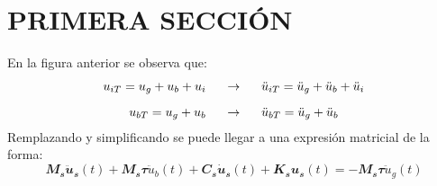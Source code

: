 \section{PRIMERA SECCIÓN}

En la figura anterior se observa que:
\begin{subequations}\label{Cap3_Eq1}
\begin{gather}
u_{iT}=u_{g}+u_{b}+u_{i} \hspace{5mm} \rightarrow \hspace{5mm} \ddot{u}_{iT}=\ddot{u}_{g}+\ddot{u}_{b}+\ddot{u}_{i}		\label{Cap3_Eq1_1} \\[2 mm]
u_{bT}=u_{g}+u_{b}\hspace{5mm} \rightarrow \hspace{5mm} \ddot{u}_{bT}=\ddot{u}_{g}+\ddot{u}_{b} \label{Cap3_Eq1_2}
\end{gather}
\end{subequations}
Remplazando y simplificando se puede llegar a una expresión matricial de la forma: 
\begin{equation}\label{Cap3_Eq3}
\mathbfit{M_{s}\ddot{u}_{s}}(t)+\mathbfit{M_{s}\tau}\ddot{u}_{b}(t)+\mathbfit{C_{s}\dot{u}_{s}}(t)+\mathbfit{K_{s}u_{s}}(t)=-\mathbfit{M_{s}\tau}\ddot{u}_{g}(t)
\end{equation}

